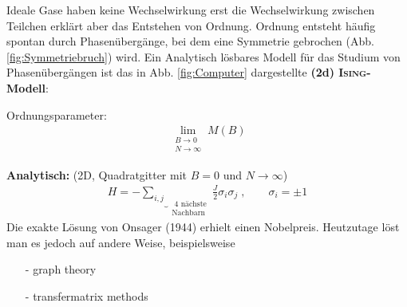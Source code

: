 \documentclass[12pt]{article}
\begin{document}
Ideale Gase haben keine Wechselwirkung erst die Wechselwirkung zwischen Teilchen erklärt aber das Entstehen von Ordnung. Ordnung entsteht häufig spontan durch Phasenübergänge, bei dem eine Symmetrie gebrochen (Abb. \ref{fig:Symmetriebruch}) wird. Ein Analytisch lösbares Modell für das Studium von Phasenübergängen ist das in Abb. \ref{fig:Computer} dargestellte \textbf{ (2d) \textsc{Ising}-Modell}: 

Ordnungsparameter: 
\begin{align*}
 \lim\limits_{\substack{B \to 0 \\ N \to \infty}} M(B)
\end{align*}

\textbf{Analytisch:}  (2D, Quadratgitter mit $B=0$ und $N \to \infty$) 
\begin{align}
H= - \underbrace{ \sum_{i,j}}_{\substack{\text{ 4 nächste} \\ \text{Nachbarn}}} \frac{J}{2}\sigma_i \sigma_j \; , \quad \quad \sigma_i=\pm 1
\end{align}
Die exakte Lösung von Onsager (1944) erhielt einen Nobelpreis. Heutzutage löst man es jedoch auf andere Weise, beispielsweise
\begin{itemize}
\item[-] graph theory
\item[-] transfermatrix methods
\end{itemize} 
\end{document}
